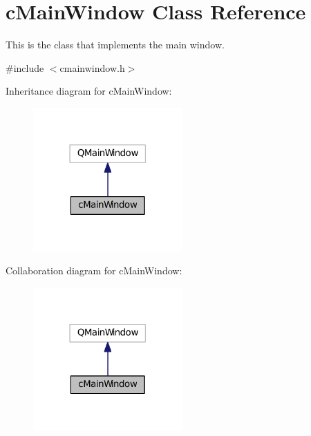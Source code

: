 \hypertarget{classc_main_window}{}\section{c\+Main\+Window Class Reference}
\label{classc_main_window}


This is the class that implements the main window.  




{\ttfamily \#include $<$cmainwindow.\+h$>$}



Inheritance diagram for c\+Main\+Window\+:
\nopagebreak
\begin{figure}[H]
\begin{center}
\leavevmode
\includegraphics[width=162pt]{classc_main_window__inherit__graph}
\end{center}
\end{figure}


Collaboration diagram for c\+Main\+Window\+:
\nopagebreak
\begin{figure}[H]
\begin{center}
\leavevmode
\includegraphics[width=162pt]{classc_main_window__coll__graph}
\end{center}
\end{figure}
